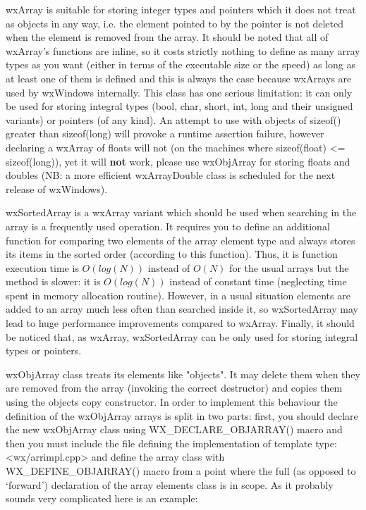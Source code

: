wxArray is suitable for storing integer types and pointers which it does not
treat as objects in any way, i.e. the element pointed to by the pointer is not
deleted when the element is removed from the array. It should be noted that
all of wxArray's functions are inline, so it costs strictly nothing to define as
many array types as you want (either in terms of the executable size or the
speed) as long as at least one of them is defined and this is always the case
because wxArrays are used by wxWindows internally. This class has one serious
limitation: it can only be used for storing integral types (bool, char, short,
int, long and their unsigned variants) or pointers (of any kind). An attempt
to use with objects of sizeof() greater than sizeof(long) will provoke a
runtime assertion failure, however declaring a wxArray of floats will not (on
the machines where sizeof(float) <= sizeof(long)), yet it will {\bf not} work,
please use wxObjArray for storing floats and doubles (NB: a more efficient
wxArrayDouble class is scheduled for the next release of wxWindows).

wxSortedArray is a wxArray variant which should be used when searching in the
array is a frequently used operation. It requires you to define an additional
function for comparing two elements of the array element type and always stores
its items in the sorted order (according to this function). Thus, it is 
  function execution time is $O(log(N))$ instead of
$O(N)$ for the usual arrays but the  method is
slower: it is $O(log(N))$ instead of constant time (neglecting time spent in
memory allocation routine). However, in a usual situation elements are added to
an array much less often than searched inside it, so wxSortedArray may lead to
huge performance improvements compared to wxArray. Finally, it should be
noticed that, as wxArray, wxSortedArray can be only used for storing integral
types or pointers.

wxObjArray class treats its elements like "objects". It may delete them when
they are removed from the array (invoking the correct destructor) and copies
them using the objects copy constructor. In order to implement this behaviour
the definition of the wxObjArray arrays is split in two parts: first, you should
declare the new wxObjArray class using WX\_DECLARE\_OBJARRAY() macro and then
you must include the file defining the implementation of template type:
<wx/arrimpl.cpp> and define the array class with WX\_DEFINE\_OBJARRAY() macro
from a point where the full (as opposed to `forward') declaration of the array
elements class is in scope. As it probably sounds very complicated here is an
example:

